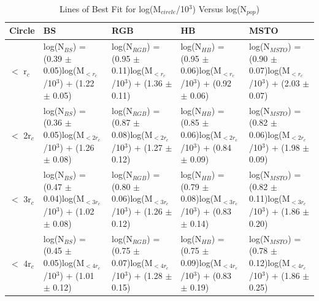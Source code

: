 \begin{table}
\tiny
\centering
\caption{Lines of Best Fit for log(M$_{circle}$/10$^3$) Versus log(N$_{pop}$)
  \label{table:Mshell_vs_Npop_cum}}
\begin{tabular}{|l|p{4cm}|p{4cm}|p{4cm}|p{4cm}|}
\hline
Circle      &        BS        &        RGB         &         HB         &       MSTO      \\
\hline
$<$ r$_c$   & log(N$_{BS}$) = (0.39 $\pm$ 0.05)log(M$_{< r_c}$/10$^3$) + (1.22 $\pm$ 0.05)  &    log(N$_{RGB}$) = (0.95 $\pm$ 0.11)log(M$_{< r_c}$/10$^3$) + (1.36 $\pm$ 0.11)    & log(N$_{HB}$) = (0.95 $\pm$ 0.06)log(M$_{< r_c}$/10$^3$) + (0.92 $\pm$ 0.06)   & log(N$_{MSTO}$) = (0.90 $\pm$ 0.07)log(M$_{< r_c}$/10$^3$) + (2.03 $\pm$ 0.07)    \\
$<$ 2r$_c$  & log(N$_{BS}$) = (0.36 $\pm$ 0.05)log(M$_{< 2r_c}$/10$^3$) + (1.26 $\pm$ 0.08)  &    log(N$_{RGB}$) = (0.87 $\pm$ 0.08)log(M$_{< 2r_c}$/10$^3$) + (1.27 $\pm$ 0.12)    & log(N$_{HB}$) = (0.85 $\pm$ 0.06)log(M$_{< 2r_c}$/10$^3$) + (0.84 $\pm$ 0.09)   & log(N$_{MSTO}$) = (0.82 $\pm$ 0.06)log(M$_{< 2r_c}$/10$^3$) + (1.98 $\pm$ 0.09)    \\
$<$ 3r$_c$  & log(N$_{BS}$) = (0.47 $\pm$ 0.04)log(M$_{< 3r_c}$/10$^3$) + (1.02 $\pm$ 0.08)  &    log(N$_{RGB}$) = (0.80 $\pm$ 0.06)log(M$_{< 3r_c}$/10$^3$) + (1.26 $\pm$ 0.12)    & log(N$_{HB}$) = (0.79 $\pm$ 0.08)log(M$_{< 3r_c}$/10$^3$) + (0.83 $\pm$ 0.14)   & log(N$_{MSTO}$) = (0.82 $\pm$ 0.11)log(M$_{< 3r_c}$/10$^3$) + (1.86 $\pm$ 0.20)    \\
$<$ 4r$_c$  & log(N$_{BS}$) = (0.45 $\pm$ 0.05)log(M$_{< 4r_c}$/10$^3$) + (1.01 $\pm$ 0.12)  &    log(N$_{RGB}$) = (0.75 $\pm$ 0.07)log(M$_{< 4r_c}$/10$^3$) + (1.28 $\pm$ 0.15)    & log(N$_{HB}$) = (0.75 $\pm$ 0.09)log(M$_{< 4r_c}$/10$^3$) + (0.83 $\pm$ 0.19)   & log(N$_{MSTO}$) = (0.78 $\pm$ 0.12)log(M$_{< 4r_c}$/10$^3$) + (1.86 $\pm$ 0.25)    \\
\hline
\end{tabular}
\end{table}

